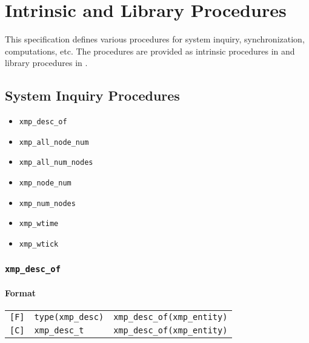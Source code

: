 \chapter{Intrinsic and Library Procedures}
\label{chap:Intrinsic and library procedures}

This specification defines various procedures for system inquiry,
synchronization, computations, etc. The procedures are provided as
intrinsic procedures in {\XMPF} and library procedures in {\XMPC}.

\section{System Inquiry Procedures}

\begin{itemize}
 \item {\tt xmp\_desc\_of}
 \item {\tt xmp\_all\_node\_num}
 \item {\tt xmp\_all\_num\_nodes}
 \item {\tt xmp\_node\_num}
 \item {\tt xmp\_num\_nodes}
 \item {\tt xmp\_wtime}
 \item {\tt xmp\_wtick}
\end{itemize}

\subsection{\tt xmp\_desc\_of}
\label{subsec: xmp_desc_of}

\subsubsection*{Format}

\begin{tabular}{lll}

\verb![F]!&  {\tt type(xmp\_desc)}& {\tt xmp\_desc\_of(xmp\_entity)}\\

\verb![C]!&  {\tt xmp\_desc\_t}& {\tt xmp\_desc\_of(xmp\_entity)}

\end{tabular}

\vspace{0.3cm}

